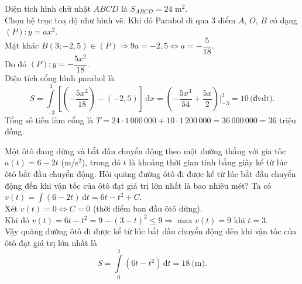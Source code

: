 \begin{ex}
{\begin{center}
		\end{center}
		Diện tích hình chữ nhật $ABCD$ là $S_{ABCD}=24 \text{~m}^2$.\\
		Chọn hệ trục toạ độ như hình vẽ. Khi đó Parabol đi qua $3$ điểm $A$, $O$, $B$ có dạng $(P)\colon y=ax^2$.\\
		Mặt khác $B(3;-2{,}5)\in (P)\Rightarrow 9a=-2{,}5\Leftrightarrow a=-\dfrac{5}{18}$.\\
		Do đó $(P)\colon y=-\dfrac{5x^2}{18}$.\\
		Diện tích cổng hình parabol là $$S=\displaystyle\int\limits_{-3}^3 \left[ \left( -\dfrac{5x^2}{18}\right)-(-2{,}5)\right]  \mathrm{\,d}x=\left( -\dfrac{5x^3}{54}+\dfrac{5x}{2}\right) \bigg|_{-3}^3=10\, \text{(đvdt)}.$$
		Tổng số tiền làm cổng là $T=24\cdot 1\,000\,000+10\cdot 1\,200\,000=36\,000\,000=36$ triệu đồng.}
\end{ex}

\begin{ex}%
Một ôtô đang dừng và bắt đầu chuyển động theo một đường thẳng với gia tốc $a(t)=6-2t$ (m/s$^2$), trong đó $t$ là khoảng thời gian tính bằng giây kể từ lúc ôtô bắt đầu chuyển động. Hỏi quãng đường ôtô đi được kể từ lúc bắt đầu chuyển động đến khi vận tốc của ôtô đạt giá trị lớn nhất là bao nhiêu mét?
{}
\loigiai
{
Ta có $v(t)=\displaystyle\int\limits (6-2t)\mathrm{\,d}t=6t-t^2+C$. \\
Xét $v(t)=0 \Leftrightarrow C=0$ (thời điểm ban đầu ôtô dừng).\\
Khi đó $v(t)=6t-t^2=9-\left(3-t\right)^2\leq 9\Rightarrow \max v(t)=9$ khi $t=3$.\\
Vậy quãng đường ôtô đi được kể từ lúc bắt đầu chuyển động đến khi vận tốc của ôtô đạt giá trị lớn nhất là
\[S=\displaystyle\int\limits_{0}^{3} \left(6t-t^2\right)\mathrm{\,d}t=18 \ \text{(m)}.\]
}
\end{ex}

